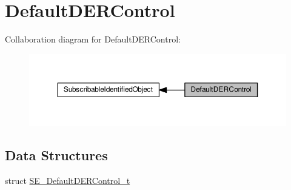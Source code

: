 \hypertarget{group__DefaultDERControl}{}\section{Default\+D\+E\+R\+Control}
\label{group__DefaultDERControl}
Collaboration diagram for Default\+D\+E\+R\+Control\+:\nopagebreak
\begin{figure}[H]
\begin{center}
\leavevmode
\includegraphics[width=350pt]{group__DefaultDERControl}
\end{center}
\end{figure}
\subsection*{Data Structures}
\begin{DoxyCompactItemize}
\item 
struct \hyperlink{structSE__DefaultDERControl__t}{S\+E\+\_\+\+Default\+D\+E\+R\+Control\+\_\+t}
\end{DoxyCompactItemize}
